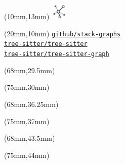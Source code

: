 \documentclass[aspectratio=169]{beamer}
\begin{document}
\begin{frame}
    \begin{textblock*}{10mm}(10mm,13mm)
        \includegraphics[width=8mm]{icons/graph.jpg}
    \end{textblock*}
    \begin{textblock*}{60mm}(20mm,10mm)
        \href{https://github.com/github/stack-graphs}{\texttt{github/stack-graphs}} \\
        \href{https://github.com/tree-sitter/tree-sitter}{\texttt{tree-sitter/tree-sitter}} \\
        \href{https://github.com/tree-sitter/tree-sitter-graph}{\texttt{tree-sitter/tree-sitter-graph}} \\
    \end{textblock*}

    \begin{textblock*}{10mm}(68mm,29.5mm)
    \end{textblock*}
    \begin{textblock*}{60mm}(75mm,30mm)
    \end{textblock*}

    \begin{textblock*}{10mm}(68mm,36.25mm)
    \end{textblock*}
    \begin{textblock*}{60mm}(75mm,37mm)
    \end{textblock*}

    \begin{textblock*}{10mm}(68mm,43.5mm)
    \end{textblock*}
    \begin{textblock*}{60mm}(75mm,44mm)
    \end{textblock*}


\end{frame}
\end{document}

